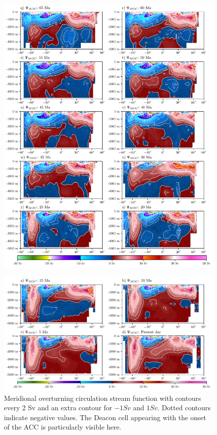 \documentclass[a4paper]{article}
\begin{document}
\newpage
\begin{multicols}{2}



\end{multicols}
\begin{figure}[H]

\includegraphics[width=0.95\linewidth]{MOC_1.pdf}
\end{figure}
\begin{figure}[H]
\includegraphics[width=0.95\linewidth]{MOC_2.pdf}
\caption{Meridional overturning circulation stream function with contours every 2 Sv and an extra contour for $-1 Sv$ and $1 Sv$. Dotted contours indicate negative values. The Deacon cell appearing with the onset of the ACC is particularly visible here.}
\label{fig:moc_total}
\end{figure}
\end{document}
